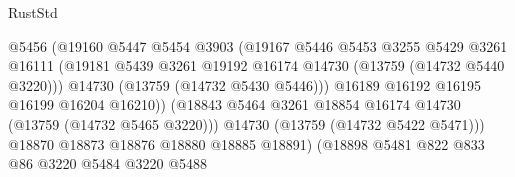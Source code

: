 \begin{lexlean}{RustStd}
\begin{coremodule}
                                          @5456
                                          (@19160
                                            @5447
                                            @5454
                                            @3903
                                            (@19167
                                              @5446
                                              @5453
                                              @3255
                                              @5429
                                              @3261
                                              @16111
                                              (@19181
                                                @5439
                                                @3261
                                                @19192
                                                @16174
                                                @14730
                                                (@13759 (@14732 @5440 @3220)))
                                              @14730
                                              (@13759 (@14732 @5430 @5446)))
                                            @16189
                                            @16192
                                            @16195
                                            @16199
                                            @16204
                                            @16210))
                                        (@18843
                                          @5464
                                          @3261
                                          @18854
                                          @16174
                                          @14730
                                          (@13759 (@14732 @5465 @3220)))
                                        @14730
                                        (@13759 (@14732 @5422 @5471)))
                                      @18870
                                      @18873
                                      @18876
                                      @18880
                                      @18885
                                      @18891)
                                    (@18898
                                      @5481
                                      @822
                                      @833
                                      @86
                                      @3220
                                      @5484
                                      @3220
                                      @5488

\end{coremodule}
\end{lexlean}
